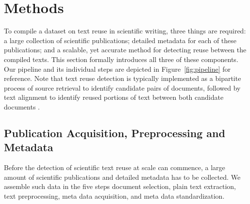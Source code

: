 \section*{Methods}
\label{sec:method}



To compile a dataset on text reuse in scientific writing, three things are required: a large collection of scientific publications; detailed metadata for each of these publications; and a scalable, yet accurate method for detecting reuse between the compiled texts. This section formally introduces all three of these components. Our pipeline and its individual steps are depicted in Figure~\ref{fig:pipeline} for reference. Note that text reuse detection is typically implemented as a bipartite process of source retrieval to identify candidate pairs of documents, followed by text alignment to identify reused portions of text between both candidate documents \cite{stein:2007d}.


\subsection*{Publication Acquisition, Preprocessing and Metadata}\label{sub:data}

Before the detection of scientific text reuse at scale can commence, a large amount of scientific publications and detailed metadata has to be collected. We assemble such data in the five steps document selection, plain text extraction, text preprocessing, meta data acquisition, and meta data standardization.

